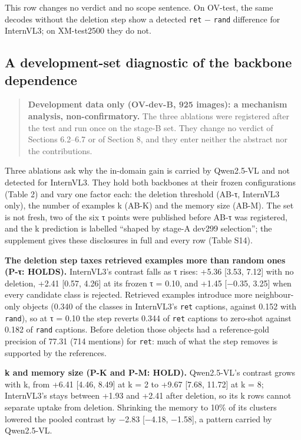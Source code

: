 \documentclass[manuscript,screen]{acmart}
\begin{document}
This row changes no verdict and no scope sentence. On OV-test, the same decodes without the deletion
step show a detected \texttt{ret} − \texttt{rand} difference for InternVL3; on XM-test2500 they do
not.

\subsection{A development-set diagnostic of the backbone
dependence}\label{a-development-set-diagnostic-of-the-backbone-dependence}

\begin{quote}
\textbf{Development data only (OV-dev-B, 925 images): a mechanism analysis, non-confirmatory.} The
three ablations were registered after the test and run once on the stage-B set. They change no
verdict of Sections 6.2--6.7 or of Section 8, and they enter neither the abstract nor the
contributions.
\end{quote}

Three ablations ask why the in-domain gain is carried by Qwen2.5-VL and not detected for InternVL3.
They hold both backbones at their frozen configurations (Table 2) and vary one factor each: the
deletion threshold (AB-τ, InternVL3 only), the number of examples k (AB-K) and the memory size
(AB-M). The set is not fresh, two of the six τ points were published before AB-τ was registered, and
the k prediction is labelled ``shaped by stage-A dev299 selection''; the supplement gives these
disclosures in full and every row (Table S14).

\textbf{The deletion step taxes retrieved examples more than random ones (P-τ: HOLDS).} InternVL3's
contrast falls as τ rises: +5.36 {[}3.53, 7.12{]} with no deletion, +2.41 {[}0.57, 4.26{]} at its
frozen τ = 0.10, and +1.45 {[}−0.35, 3.25{]} when every candidate class is rejected. Retrieved
examples introduce more neighbour-only objects (0.340 of the classes in InternVL3's \texttt{ret}
captions, against 0.152 with \texttt{rand}), so at τ = 0.10 the step reverts 0.344 of \texttt{ret}
captions to zero-shot against 0.182 of \texttt{rand} captions. Before deletion those objects had a
reference-gold precision of 77.31 (714 mentions) for \texttt{ret}: much of what the step removes is
supported by the references.

\textbf{k and memory size (P-K and P-M: HOLD).} Qwen2.5-VL's contrast grows with k, from +6.41
{[}4.46, 8.49{]} at k = 2 to +9.67 {[}7.68, 11.72{]} at k = 8; InternVL3's stays between +1.93 and
+2.41 after deletion, so its k rows cannot separate uptake from deletion. Shrinking the memory to
10\% of its clusters lowered the pooled contrast by −2.83 {[}−4.18, −1.58{]}, a pattern carried by
Qwen2.5-VL.
\end{document}
